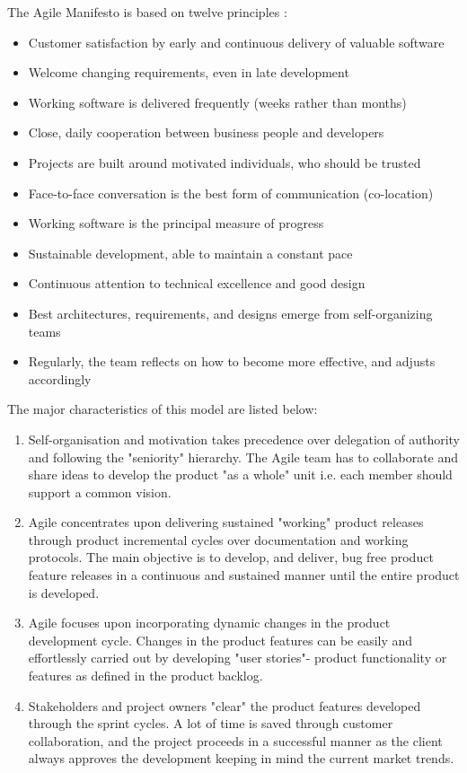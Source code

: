 The Agile Manifesto is based on twelve principles :
\begin{itemize}
	\item Customer satisfaction by early and continuous delivery of valuable software
	\item Welcome changing requirements, even in late development
	\item Working software is delivered frequently (weeks rather than months)
	\item Close, daily cooperation between business people and developers
	\item Projects are built around motivated individuals, who should be trusted
	\item Face-to-face conversation is the best form of communication (co-location)
	\item Working software is the principal measure of progress
	\item Sustainable development, able to maintain a constant pace
	\item Continuous attention to technical excellence and good design
	\item Best architectures, requirements, and designs emerge from self-organizing teams
	\item Regularly, the team reflects on how to become more effective, and adjusts accordingly
\end{itemize}

The major characteristics of this model are listed below:
\begin{enumerate}
	\item Self-organisation and motivation takes precedence over delegation of authority and following the "seniority" hierarchy. The Agile team has to collaborate and share ideas to develop the product "as a whole" unit i.e. each member should support a common vision.
	\item Agile concentrates upon delivering sustained "working" product releases through product incremental cycles over documentation and working protocols. The main objective is to develop, and deliver, bug free product feature releases in a continuous and sustained manner until the entire product is developed.
	\item Agile focuses upon incorporating dynamic changes in the product development cycle. Changes in the product features can be easily and effortlessly carried out by developing "user stories"- product functionality or features as defined in the product backlog.
	\item Stakeholders and project owners "clear" the product features developed through the sprint cycles. A lot of time is saved through customer collaboration, and the project proceeds in a successful manner as the client always approves the development keeping in mind the current market trends.
\end{enumerate}

